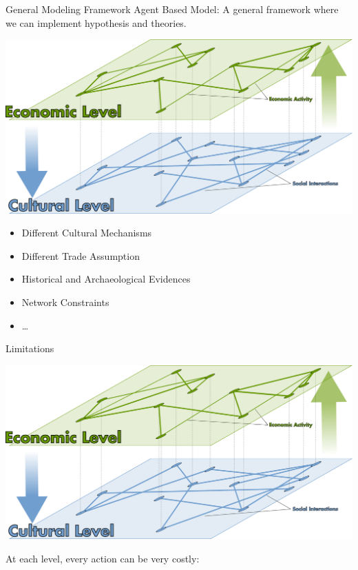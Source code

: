 \documentclass[10pt, notes=show]{beamer}
\begin{document}
\begin{frame}{General Modeling Framework}
    \vfill
    Agent Based Model:
    A general framework where we can implement hypothesis and theories.
    \begin{center}
	\includegraphics[width=.5\textwidth]{images/cooev.png}	
    \end{center}
    \vfill
	\begin{itemize}
	\item Different Cultural Mechanisms
    \vfill
	\item Different Trade Assumption
    \vfill
	\item Historical and Archaeological Evidences 
    \vfill
	\item Network Constraints
    \vfill
	\item \dots
    \vfill
	\end{itemize}
\end{frame}
	
\begin{frame}{Limitations}
    \begin{center}
	\includegraphics[width=.6\textwidth]{images/cooev.png}	
    \end{center}
    At each level, every action can be very costly:
    \begin{itemize}
    \end{itemize}
\end{frame}
\end{document}
